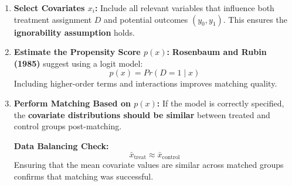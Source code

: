 \documentclass[10pt, oneside]{article}
\begin{document}
\begin{enumerate}
    \item \textbf{Select Covariates $x_i$:}  
    Include all relevant variables that influence both treatment assignment $D$ and potential outcomes $(y_0, y_1)$. This ensures the \textbf{ignorability assumption} holds.

    \item \textbf{Estimate the Propensity Score $p(x)$:}  
    \textbf{Rosenbaum and Rubin (1985)} suggest using a logit model:
    \begin{equation}
    p(x) = Pr(D=1 \mid x)
    \end{equation}
    Including higher-order terms and interactions improves matching quality.

    \item \textbf{Perform Matching Based on $p(x)$:}  
    If the model is correctly specified, the \textbf{covariate distributions should be similar} between treated and control groups post-matching.

    \textbf{Data Balancing Check:}
    \begin{equation}
    \bar{x}_{\text{treat}} \approx \bar{x}_{\text{control}}
    \end{equation}
    Ensuring that the mean covariate values are similar across matched groups confirms that matching was successful.
\end{enumerate}
\end{document}
